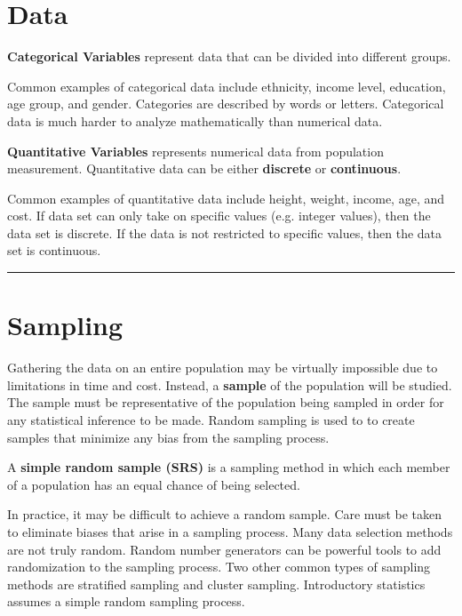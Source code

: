 \documentclass{article}
\theoremstyle{definition}
\newcommand{\secend}[0]{\noindent\rule[0.5ex]{\linewidth}{1pt}}
\begin{document}
\section{Data}
\begin{definition}
    \textbf{Categorical Variables} represent data that can be divided into different
    groups.
\end{definition}

\noindent Common examples of categorical data include ethnicity, income level,
education, age group, and gender. Categories are described by words or letters.
Categorical data is much harder to analyze mathematically than numerical data.
\begin{definition}
    \textbf{Quantitative Variables} represents numerical data from population
    measurement. Quantitative data can be either \textbf{discrete} or
    \textbf{continuous}.
\end{definition}

\noindent Common examples of quantitative data include height, weight, income, age, and
cost. If data set can only take on specific values (e.g. integer values), then
the data set is discrete. If the data is not restricted to specific values, then
the data set is continuous. 

\secend

\section{Sampling}
Gathering the data on an entire population may be virtually impossible due to
limitations in time and cost. Instead, a \textbf{sample} of the population will
be studied. The sample must be representative of the population being sampled in
order for any statistical inference to be made. Random sampling is used to to
create samples that minimize any bias from the sampling process. 

\begin{definition}
    A \textbf{simple random sample (SRS)} is a sampling method in which each
    member of a population has an equal chance of being selected.
\end{definition}

\noindent In practice, it may be difficult to achieve a random sample. Care must be taken
to eliminate biases that arise in a sampling process. Many data selection
methods are not truly random. Random number generators can be powerful tools to
add randomization to the sampling process. Two other common types of sampling methods are 
stratified sampling and cluster sampling. Introductory statistics assumes a simple random 
sampling process.
    
\end{document}
